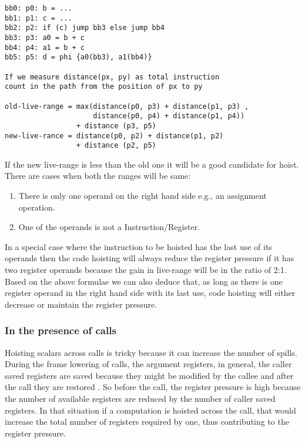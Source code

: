 \documentclass{sig-alternate}
\begin{document}
\begin{verbatim}
bb0: p0: b = ...
bb1: p1: c = ...
bb2: p2: if (c) jump bb3 else jump bb4
bb3: p3: a0 = b + c
bb4: p4: a1 = b + c
bb5: p5: d = phi {a0(bb3), a1(bb4)}

If we measure distance(px, py) as total instruction
count in the path from the position of px to py

old-live-range = max(distance(p0, p3) + distance(p1, p3) ,
                     distance(p0, p4) + distance(p1, p4))
                 + distance (p3, p5)
new-live-rance = distance(p0, p2) + distance(p1, p2)
                 + distance (p2, p5)
\end{verbatim}

If the new live-range is less than the old one it will be a good candidate
for hoist. There are cases when both the ranges will be same:
\begin{enumerate}
  \item There is only one operand on the right hand side e.g., an assignment operation.
  \item One of the operands is not a Instruction/Register.
\end{enumerate}

In a special case where the instruction to be hoisted has the last use of its
operands then the code hoisting will always reduce the register pressure if it
has two register operands because the gain in live-range will be in the ratio of
2:1. Based on the above formulae we can also deduce that, as long as there is
one register operand in the right hand side with its last use, code hoisting
will either decrease or maintain the register pressure.

\subsubsection{In the presence of calls}
\label{cost:across-calls}
Hoisting scalars across calls is tricky because it can increase the number of
spills. During the frame lowering of calls, the argument registers, in general,
the caller saved registers are saved because they might be modified by the
callee and after the call they are restored \cite{frame-lowering}. So before the
call, the register pressure is high because the number of available registers
are reduced by the number of caller saved registers. In that situation if a
computation is hoisted across the call, that would increase the total number of
registers required by one, thus contributing to the register pressure.
\end{document}
